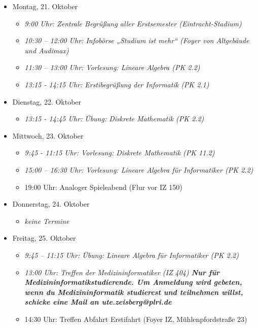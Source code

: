 \begin{itemize}
    \item Montag, 21. Oktober
        \begin{itemize}
            \item \textit{9:00 Uhr: Zentrale Begrüßung aller Erstsemester (Eintracht-Stadium)}
            \item \textit{10:30 – 12:00 Uhr: Infobörse „Studium ist mehr“ (Foyer von Altgebäude und Audimax)}
            \item \textit{11:30 – 13:00 Uhr: Vorlesung: Lineare Algebra (PK 2.2)}
            \item \textit{13:15 - 14:15 Uhr: Erstibegrüßung der Informatik (PK 2.1)}
        \end{itemize}
    \item Dienstag, 22. Oktober
        \begin{itemize}
            \item \textit{13:15 - 14:45 Uhr: Übung: Diskrete Mathematik (PK 2.2)}
        \end{itemize}
    \item Mittwoch, 23. Oktober
        \begin{itemize}
            \item \textit{9:45 - 11:15 Uhr: Vorlesung: Diskrete Mathematik (PK 11.2)}
            \item \textit{15:00 – 16:30 Uhr: Vorlesung: Lineare Algebra für Informatiker (PK 2.2)}
            \item 19:00 Uhr: Analoger Spieleabend (Flur vor IZ 150)
        \end{itemize}
    \item Donnerstag, 24. Oktober
        \begin{itemize}
            \item \textit{keine Termine}
        \end{itemize}
    \item Freitag, 25. Oktober
        \begin{itemize}
            \item \textit{9:45 – 11:15 Uhr: Übung: Lineare Algebra für Informatiker (PK 2.2)}
            \item \textit{13:00 Uhr: Treffen der Medizininformatiker (IZ 404) \textbf{Nur für Medizininformatikstudierende. Um Anmeldung wird gebeten, wenn du Medizininformatik studierest und teilnehmen willst, schicke eine Mail an ute.zeisberg@plri.de}}
            \item 14:30 Uhr: Treffen Abfahrt Erstifahrt (Foyer IZ, Mühlenpfordstraße 23)
        \end{itemize}

\end{itemize}
